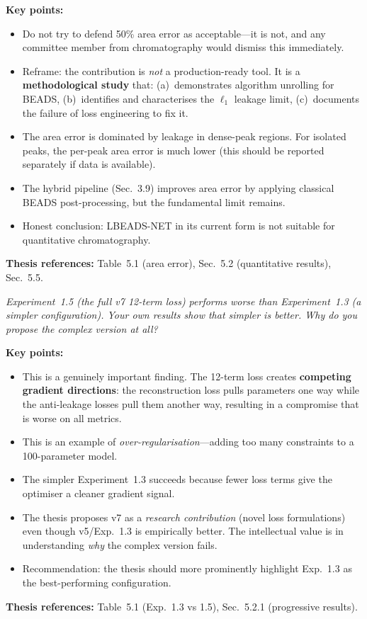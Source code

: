 \documentclass[11pt, letterpaper]{article}
\newcounter{qcounter}
\newcommand{\question}[1]{%
  \stepcounter{qcounter}%
  \begin{questionbox}[Q\theqcounter]%
    \itshape #1%
  \end{questionbox}%
}
\begin{document}
\begin{answerbox}
\textbf{Key points:}
\begin{itemize}[nosep]
  \item Do not try to defend 50\% area error as acceptable---it is
        not, and any committee member from chromatography would dismiss
        this immediately.
  \item Reframe: the contribution is \emph{not} a production-ready
        tool.  It is a \textbf{methodological study} that:
        (a)~demonstrates algorithm unrolling for BEADS,
        (b)~identifies and characterises the $\ell_1$ leakage limit,
        (c)~documents the failure of loss engineering to fix it.
  \item The area error is dominated by leakage in dense-peak regions.
        For isolated peaks, the per-peak area error is much lower
        (this should be reported separately if data is available).
  \item The hybrid pipeline (Sec.~3.9) improves area error by
        applying classical BEADS post-processing, but the fundamental
        limit remains.
  \item Honest conclusion: LBEADS-NET in its current form is not
        suitable for quantitative chromatography.
\end{itemize}
\textbf{Thesis references:} Table~5.1 (area error), Sec.~5.2 (quantitative results), Sec.~5.5.
\end{answerbox}

\question{Experiment~1.5 (the full v7 12-term loss) performs \emph{worse}
than Experiment~1.3 (a simpler configuration).  Your own results
show that simpler is better.  Why do you propose the complex
version at all?}

\begin{answerbox}
\textbf{Key points:}
\begin{itemize}[nosep]
  \item This is a genuinely important finding.  The 12-term loss
        creates \textbf{competing gradient directions}: the
        reconstruction loss pulls parameters one way while the
        anti-leakage losses pull them another way, resulting in
        a compromise that is worse on all metrics.
  \item This is an example of \emph{over-regularisation}---adding
        too many constraints to a 100-parameter model.
  \item The simpler Experiment~1.3 succeeds because fewer loss terms
        give the optimiser a cleaner gradient signal.
  \item The thesis proposes v7 as a \emph{research contribution}
        (novel loss formulations) even though v5/Exp.~1.3 is
        empirically better.  The intellectual value is in
        understanding \emph{why} the complex version fails.
  \item Recommendation: the thesis should more prominently highlight
        Exp.~1.3 as the best-performing configuration.
\end{itemize}
\textbf{Thesis references:} Table~5.1 (Exp.~1.3 vs 1.5), Sec.~5.2.1 (progressive results).
\end{answerbox}
\end{document}

